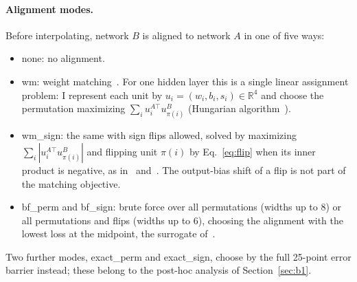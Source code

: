 \documentclass[11pt]{article}
\newcommand{\md}[1]{\textsf{#1}}
\begin{document}
\paragraph{Alignment modes.} Before interpolating, network $B$ is aligned to network $A$ in one of five ways:
\begin{itemize}[leftmargin=*]
\item \md{none}: no alignment.
\item \md{wm}: weight matching~\cite{ainsworth2023git}. For one hidden layer this is a single linear assignment problem: I represent each unit by $u_i = (w_i, b_i, s_i) \in \mathbb{R}^4$ and choose the permutation maximizing $\sum_i u_i^{A\top} u_{\pi(i)}^{B}$ (Hungarian algorithm~\cite{kuhn1955hungarian}).
\item \md{wm\_sign}: the same with sign flips allowed, solved by maximizing $\sum_i |u_i^{A\top} u_{\pi(i)}^{B}|$ and flipping unit $\pi(i)$ by Eq.~\eqref{eq:flip} when its inner product is negative, as in~\cite[Section~3.1.2]{pittorino2022deep} and~\cite[Proposition~1]{boufalis2025symmetry}. The output-bias shift of a flip is not part of the matching objective.
\item \md{bf\_perm} and \md{bf\_sign}: brute force over all permutations (widths up to 8) or all permutations and flips (widths up to 6), choosing the alignment with the lowest loss at the midpoint, the surrogate of~\cite{entezari2022role}.
\end{itemize}
Two further modes, \md{exact\_perm} and \md{exact\_sign}, choose by the full 25-point error barrier instead; these belong to the post-hoc analysis of Section~\ref{sec:b1}.
\end{document}

